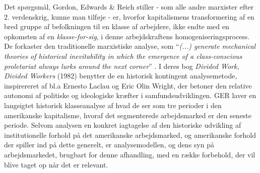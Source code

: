 Det spørgsmål, Gordon, Edwards \& Reich stiller - som alle andre marxister efter 2. verdenskrig, kunne man tilføje - er, hvorfor kapitalismens transformering af en bred gruppe af befolkningen til en klasse af arbejdere, ikke endte med en opkomsten af en \emph{klasse-for-sig}, i denne arbejdskraftens homogeniseringsprocess.  De forkaster den traditionelle marxistiske analyse, som “\emph{(...) generate mechanical theories of historical inevitability in which the emergence of a class-conscious proletariat always lurks around the next corner}” \parencite[21]{Gordon1982}. I deres bog \emph{Divided Work, Divided Workers} (1982) benytter de en historisk kontingent analysemetode, inspirereret af bl.a Ernesto Laclau og Eric Olin Wright, der betoner den relative autonomi af politiske og ideologiske kræfter i samfundsudviklingen. GER laver en langsigtet historisk klasseanalyse af hvad de ser som tre perioder i den amerikanske kapitalisme, hvoraf det segmenterede arbejdsmarked er den seneste periode. Selvom analysen en konkret iagtagelse af den historiske udvikling af institutionelle forhold på det amerikanske arbejdsmarked, og amerikanske forhold der spiller ind på dette generelt, er analysemodellen, og dens syn på arbejdsmarkedet, brugbart for denne afhandling, med en række forbehold, der vil blive taget op når det er relevant. 

